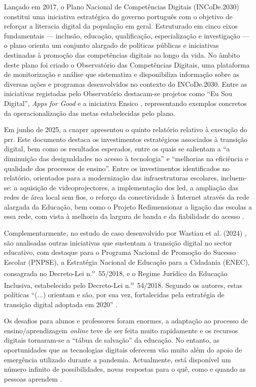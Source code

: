 Lançado em 2017, o Plano Nacional de Competências Digitais (INCoDe.2030) \cite{incode2030} constitui uma iniciativa estratégica do governo português com o objetivo de reforçar a literacia digital da população em geral. Estruturado em cinco eixos fundamentais — inclusão, educação, qualificação, especialização e investigação — o plano orienta um conjunto alargado de políticas públicas e iniciativas destinadas à promoção das competências digitais ao longo da vida. No âmbito deste plano foi criado o Observatório das Competências Digitais, uma plataforma de monitorização e análise que sistematiza e disponibiliza informação sobre as diversas ações e programas desenvolvidos no contexto do INCoDe.2030. Entre as iniciativas registadas pelo Observatório destacam-se projetos como “Eu Sou Digital”, \textit{Apps for Good} e a iniciativa Ensico \cite{observatorio2030}, representando exemplos concretos da operacionalização das metas estabelecidas pelo plano.

Em junho de 2025, a \acrshort{cnaprr} apresentou o quinto relatório relativo à execução do \acrshort{prr}. Este documento destaca os investimentos estratégicos associados à transição digital, bem como os resultados esperados, entre os quais se salientam a ``a diminuição das desigualdades no acesso à tecnologia'' e ``melhorias na eficiência e qualidade dos processos de ensino''. Entre os investimentos identificados no relatório, orientados para a modernização das infraestruturas escolares, incluem-se: a aquisição de videoprojectores, a implementação dos \acrfull{led}, a ampliação das redes de área local sem fios, o reforço da conectividade à Internet através da rede alargada da Educação, bem como o Projeto Redimensionar a ligação das escolas a essa rede, com vista à melhoria da largura de banda e da fiabilidade do acesso \cite{cnaprr2025}.

Complementarmente, no estudo de caso desenvolvido por Wastiau et al. (2024) \cite{estrategiatransdigital}, são analisadas outras iniciativas que sustentam a transição digital no sector educativo, com destaque para o Programa Nacional de Promoção do Sucesso Escolar (PNPSE), a Estratégia Nacional de Educação para a Cidadania (ENEC), consagrada no Decreto-Lei n.\textsuperscript{o}~55/2018, e o Regime Jurídico da Educação Inclusiva, estabelecido pelo Decreto-Lei n.\textsuperscript{o}~54/2018. Segundo os autores, estas políticas ``(...) orientam e são, por sua vez, fortalecidas pela estratégia de transição digital adoptada em 2020'' \cite{estrategiatransdigital}.

Os desafios para alunos e professores foram enormes, a adaptação ao processo de ensino/aprendizagem \textit{online} teve de ser feita muito rapidamente e os recursos digitais tornaram-se a ``tábua de salvação'' da educação. No entanto, as oportunidades que as tecnologias digitais oferecem vão muito além do apoio de emergência utilizado durante a pandemia. Actualmente, está disponível um número infinito de possibilidades, novas respostas para o quê, como e quando as pessoas aprendem \cite{oecd_state_2021}.


